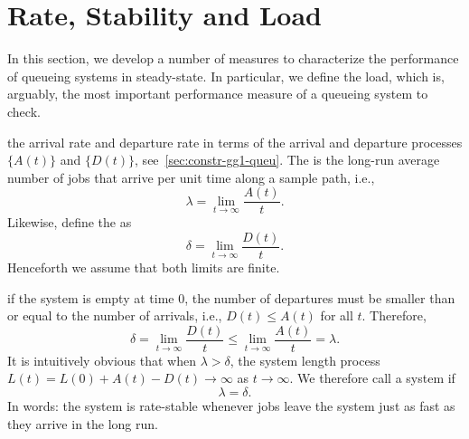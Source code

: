 


\section{Rate, Stability and Load}
\label{sec:rate-stability}



In this section, we develop a number of measures to characterize the performance of queueing systems in steady-state.
In particular, we define the load, which is, arguably, the most important performance measure of a queueing system to check.




 the arrival rate and departure rate in terms of the arrival and departure processes $\{A(t)\}$ and $\{D(t)\}$, see~\cref{sec:constr-gg1-queu}.
The  is the long-run average number of jobs that arrive per unit time along a sample path, i.e.,
\begin{equation}\label{eq:3}
 \lambda = \lim_{t\to\infty} \frac{A(t)}t.
\end{equation}
Likewise, define the  as
\begin{equation}\label{eq:28}
 \delta = \lim_{t\to\infty} \frac{D(t)}t.
\end{equation}
Henceforth we assume that both limits are finite.

 if the system is empty at time $0$,
 the number of departures must be smaller than or equal to the number of arrivals, i.e., $D(t) \leq A(t)$ for all $t$.
Therefore,
\begin{equation*}
\delta = \lim_{t\to\infty} \frac{D(t)}t \leq \lim_{t\to\infty} \frac{A(t)}t = \lambda.
\end{equation*}
It is intuitively obvious that when $\lambda > \delta$, the system length process $L(t)=L(0)+A(t) - D(t) \to \infty$ as $t\to \infty$.
We therefore call a system  if
\begin{equation}\label{eq:84}
 \lambda = \delta.
\end{equation}
In  words: the system is rate-stable whenever jobs leave the system just as fast as they arrive in the long run.

